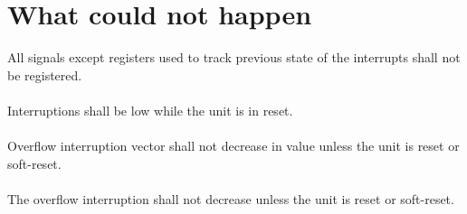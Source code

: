 \section{What could not happen}

All signals except registers used to track previous state of the interrupts shall not be registered.\\
\\
Interruptions shall be low while the unit is in reset.\\
\\
Overflow interruption vector shall not decrease in value unless the unit is reset or soft-reset.\\
\\
The overflow interruption shall not decrease unless the  unit is reset or soft-reset.
